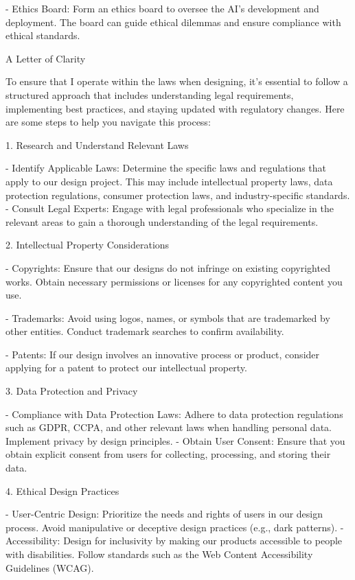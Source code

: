 \documentclass[12pt,letterpaper]{article}
\begin{document}
- Ethics Board: Form an ethics board to oversee the AI's development and deployment. The board can guide ethical dilemmas and ensure compliance with ethical standards.
	
	
	
                                                A Letter of Clarity 

To ensure that I operate within the laws when designing, it's essential to follow a structured approach that includes understanding legal requirements, implementing best practices, and staying updated with regulatory changes. Here are some steps to help you navigate this process:

 1. Research and Understand Relevant Laws

- Identify Applicable Laws: Determine the specific laws and regulations that apply to our design project. This may include intellectual property laws, data protection regulations, consumer protection laws, and industry-specific standards.
- Consult Legal Experts: Engage with legal professionals who specialize in the relevant areas to gain a thorough understanding of the legal requirements.

 2. Intellectual Property Considerations

- Copyrights: Ensure that our designs do not infringe on existing copyrighted works. Obtain necessary permissions or licenses for any copyrighted content you use.

- Trademarks: Avoid using logos, names, or symbols that are trademarked by other entities. Conduct trademark searches to confirm availability.

- Patents: If our design involves an innovative process or product, consider applying for a patent to protect our intellectual property.

 3. Data Protection and Privacy

- Compliance with Data Protection Laws: Adhere to data protection regulations such as GDPR, CCPA, and other relevant laws when handling personal data. Implement privacy by design principles.
- Obtain User Consent: Ensure that you obtain explicit consent from users for collecting, processing, and storing their data.

 4. Ethical Design Practices

- User-Centric Design: Prioritize the needs and rights of users in our design process. Avoid manipulative or deceptive design practices (e.g., dark patterns).
- Accessibility: Design for inclusivity by making our products accessible to people with disabilities. Follow standards such as the Web Content Accessibility Guidelines (WCAG).
\end{document}
